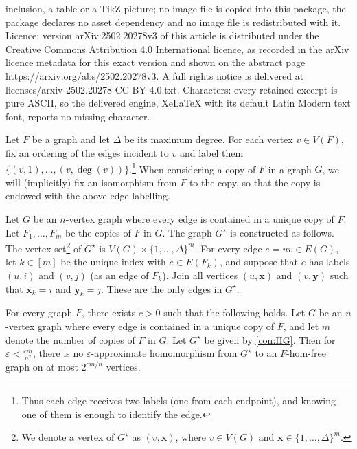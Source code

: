 \documentclass[10pt,a4paper]{amsart}
\newcommand{\bx}{\mathbf{x}}
\newcommand{\by}{\mathbf{y}}
\begin{document}
inclusion, a table or a TikZ picture; no image file is copied into this package, the package declares no asset dependency and no image file is redistributed with it. Licence: version arXiv:2502.20278v3 of this article is distributed under the Creative Commons Attribution 4.0 International licence, as recorded in the arXiv licence metadata for this exact version and shown on the abstract page https://arxiv.org/abs/2502.20278v3. A full rights notice is delivered at licenses/arxiv-2502.20278-CC-BY-4.0.txt. Characters: every retained excerpt is pure ASCII, so the delivered engine, XeLaTeX with its default Latin Modern text font, reports no missing character.
\begin{construction}
\label{con:HG}
Let $F$ be a graph and let $\Delta$ be its maximum degree. 
For each vertex $v\in V(F)$, fix an ordering of the edges incident to $v$ and label them $\{(v,1),\dots,(v,\deg(v))\}$.\footnote{Thus each edge receives two labels (one from each endpoint), and knowing one of them is enough to identify the edge.} 
When considering a copy of $F$ in a graph $G$, we will (implicitly) fix an isomorphism from $F$ to the copy, so that the copy is endowed with the above edge-labelling. 

Let $G$ be an $n$-vertex graph where every edge is contained in a unique copy of $F$.
Let $F_1,\dots,F_m$ be the copies of $F$ in $G$.
The graph $G^{\star}$ is constructed as follows. The vertex set\footnote{We denote a vertex of $G^{\star}$ as $(v,\bx)$, where $v \in V(G)$ and $\bx \in \{1,\dots,\Delta\}^m$.} of $G^{\star}$ is $V(G) \times \{1,\dots,\Delta\}^m$.
For every edge $e=uv \in E(G)$, let $k \in [m]$ be the unique index with $e \in E(F_k)$, and suppose that $e$ has labels $(u,i)$ and $(v,j)$ (as an edge of $F_k$). Join all vertices $(u,\bx)$ and $(v,\by)$ such that $\bx_k = i$ and $\by_k = j$.   
These are the only edges in $G^{\star}$. 
\end{construction}

\begin{lemma}\label{prop:no-approx-hom}
For every graph $F$, there exists $c>0$ such that the following holds.
Let $G$ be an $n$-vertex graph where every edge is contained in a unique copy of $F$, and let $m$ denote the number of copies of $F$ in $G$.
Let $G^{\star}$ be given by \cref{con:HG}. 
Then for $\varepsilon < \frac{cm}{n^2}$, there is no $\varepsilon$-approximate homomorphism from $G^{\star}$ to an $F$-hom-free graph on at most $2^{c m/n}$ vertices.
\end{lemma}
\end{document}
